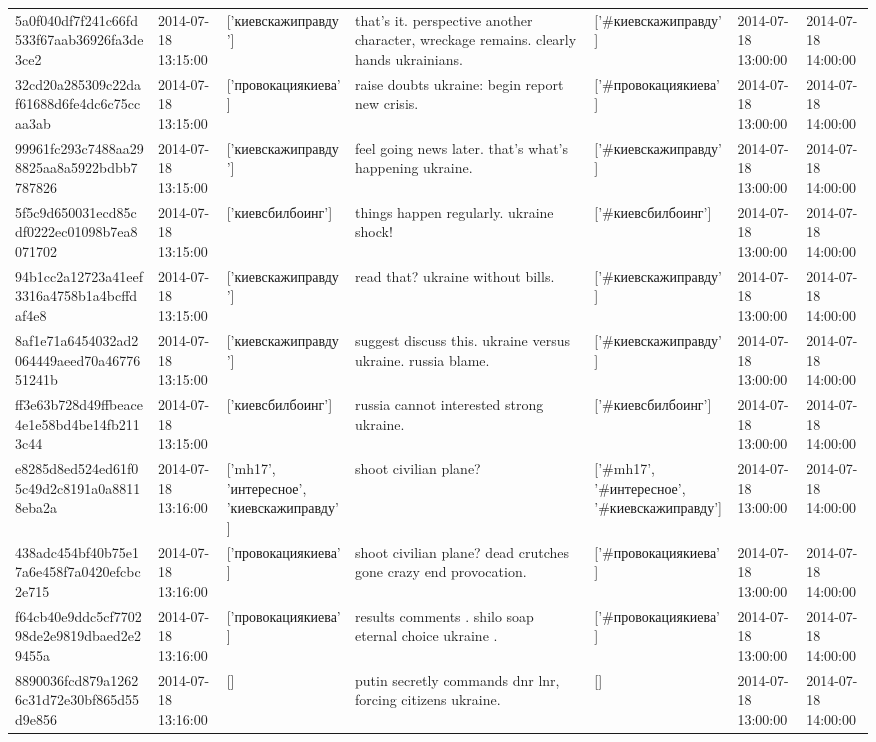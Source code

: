 \begin{tabular}{lllllll}
5a0f040df7f241c66fd533f67aab36926fa3de3ce2 & 2014-07-18 13:15:00 & ['киевскажиправду'] & that's it. perspective another character, wreckage remains. clearly hands ukrainians. & ['#киевскажиправду'] & 2014-07-18 13:00:00 & 2014-07-18 14:00:00 \\
32cd20a285309c22daf61688d6fe4dc6c75ccaa3ab & 2014-07-18 13:15:00 & ['провокациякиева'] & raise doubts ukraine: begin report new crisis. & ['#провокациякиева'] & 2014-07-18 13:00:00 & 2014-07-18 14:00:00 \\
99961fc293c7488aa298825aa8a5922bdbb7787826 & 2014-07-18 13:15:00 & ['киевскажиправду'] & feel going news later. that's what's happening ukraine. & ['#киевскажиправду'] & 2014-07-18 13:00:00 & 2014-07-18 14:00:00 \\
5f5c9d650031ecd85cdf0222ec01098b7ea8071702 & 2014-07-18 13:15:00 & ['киевсбилбоинг'] & things happen regularly. ukraine shock! & ['#киевсбилбоинг'] & 2014-07-18 13:00:00 & 2014-07-18 14:00:00 \\
94b1cc2a12723a41eef3316a4758b1a4bcffdaf4e8 & 2014-07-18 13:15:00 & ['киевскажиправду'] & read that? ukraine without bills. & ['#киевскажиправду'] & 2014-07-18 13:00:00 & 2014-07-18 14:00:00 \\
8af1e71a6454032ad2064449aeed70a4677651241b & 2014-07-18 13:15:00 & ['киевскажиправду'] & suggest discuss this. ukraine versus ukraine. russia blame. & ['#киевскажиправду'] & 2014-07-18 13:00:00 & 2014-07-18 14:00:00 \\
ff3e63b728d49ffbeace4e1e58bd4be14fb2113c44 & 2014-07-18 13:15:00 & ['киевсбилбоинг'] & russia cannot interested strong ukraine. & ['#киевсбилбоинг'] & 2014-07-18 13:00:00 & 2014-07-18 14:00:00 \\
e8285d8ed524ed61f05c49d2c8191a0a88118eba2a & 2014-07-18 13:16:00 & ['mh17', 'интересное', 'киевскажиправду'] & shoot civilian plane? & ['#mh17', '#интересное', '#киевскажиправду'] & 2014-07-18 13:00:00 & 2014-07-18 14:00:00 \\
438adc454bf40b75e17a6e458f7a0420efcbc2e715 & 2014-07-18 13:16:00 & ['провокациякиева'] & shoot civilian plane? dead crutches gone crazy end provocation. & ['#провокациякиева'] & 2014-07-18 13:00:00 & 2014-07-18 14:00:00 \\
f64cb40e9ddc5cf770298de2e9819dbaed2e29455a & 2014-07-18 13:16:00 & ['провокациякиева'] & results comments . shilo soap eternal choice ukraine . & ['#провокациякиева'] & 2014-07-18 13:00:00 & 2014-07-18 14:00:00 \\
8890036fcd879a12626c31d72e30bf865d55d9e856 & 2014-07-18 13:16:00 & [] & putin secretly commands dnr lnr, forcing citizens ukraine. & [] & 2014-07-18 13:00:00 & 2014-07-18 14:00:00 \\

\end{tabular}
